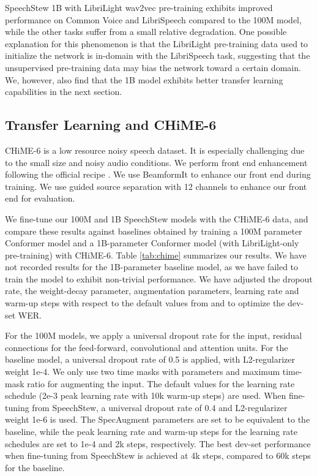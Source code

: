 \documentclass[a4paper]{article}
\begin{document}
SpeechStew 1B with LibriLight wav2vec pre-training \cite{baevski-arxiv-2020} exhibits improved performance on Common Voice and LibriSpeech compared to the 100M model, while the other tasks suffer from a small relative degradation. One possible explanation for this phenomenon is that the LibriLight pre-training data used to initialize the network is in-domain with the LibriSpeech task, suggesting that the unsupervised pre-training data may bias the network toward a certain domain. We, however, also find that the 1B model exhibits better transfer learning capabilities in the next section.

\subsection{Transfer Learning and CHiME-6}

CHiME-6 \cite{watanabe-arxiv-2020} is a low resource noisy speech dataset. It is especially challenging due to the small size and noisy audio conditions. We perform front end enhancement following the official recipe \cite{watanabe-arxiv-2020}. We use BeamformIt to enhance our front end during training. We use guided source separation \cite{boeddecker-chime-2018} with 12 channels to enhance our front end for evaluation.

We fine-tune our 100M and 1B SpeechStew models with the CHiME-6 data, and compare these results against baselines obtained by training a 100M parameter Conformer model and a 1B-parameter Conformer model (with LibriLight-only pre-training) with CHiME-6. Table \ref{tab:chime} summarizes our results. We have not recorded results for the 1B-parameter baseline model, as we have failed to train the model to exhibit non-trivial performance. We have adjusted the dropout rate, the weight-decay parameter, augmentation parameters, learning rate and warm-up steps with respect to the default values from \cite{gulati-interspeech-2020} and \cite{zhang-arxiv-2020} to optimize the dev-set WER.

For the 100M models, we apply a universal dropout rate for the input, residual connections for the feed-forward, convolutional and attention units. For the baseline model, a universal dropout rate of 0.5 is applied, with L2-regularizer weight 1e-4. We only use two time masks with parameters  and maximum time-mask ratio  for augmenting the input. The default values for the learning rate schedule (2e-3 peak learning rate with 10k warm-up steps) are used. When fine-tuning from SpeechStew, a universal dropout rate of 0.4 and L2-regularizer weight 1e-6 is used. The SpecAugment parameters are set to be equivalent to the baseline, while the peak learning rate and warm-up steps for the learning rate schedules are set to 1e-4 and 2k steps, respectively. The best dev-set performance when fine-tuning from SpeechStew is achieved at 4k steps, compared to 60k steps for the baseline.
\end{document}
